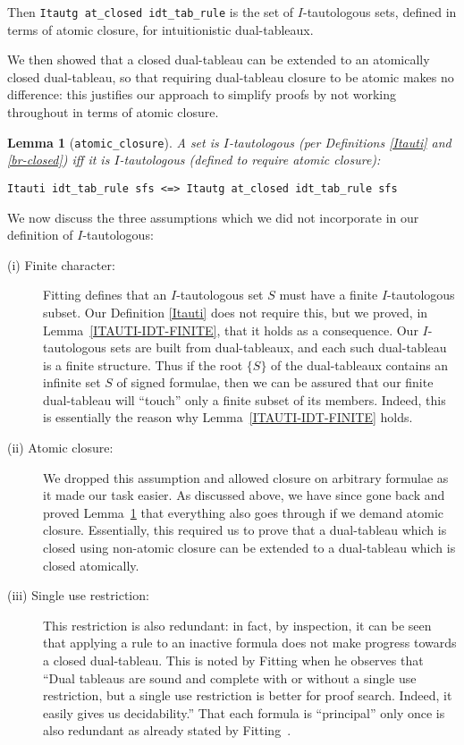 \documentclass[a4paper]{article}
\newtheorem{lemma}{Lemma}
\begin{document}
Then \texttt{Itautg at\_closed idt\_tab\_rule} is the set of
$I$-tautologous sets, defined in terms of atomic closure, for
intuitionistic dual-tableaux.

We then showed 
that a closed dual-tableau can be extended to an atomically closed
dual-tableau, so
that requiring dual-tableau closure to be atomic makes no difference:
this justifies our approach to simplify proofs by not working throughout
in terms of atomic closure.

\begin{lemma}[\texttt{atomic\_closure}]\label{atomic-closure}
A set is $I$-tautologous (per Definitions \ref{Itauti} and \ref{br-closed})
iff it is $I$-tautologous (defined to require atomic closure):
\end{lemma}
\begin{verbatim}
Itauti idt_tab_rule sfs <=> Itautg at_closed idt_tab_rule sfs 
\end{verbatim}

We now discuss the three assumptions which we did not incorporate
in our definition of $I$-tautologous:
\begin{description}
\item[\rm (i) Finite character:] Fitting defines that an $I$-tautologous
  set $S$ must have a finite $I$-tautologous subset.
  Our Definition \ref{Itauti} does not require this, but we proved,
  in Lemma~\ref{ITAUTI-IDT-FINITE}, that it holds as a consequence.
  Our $I$-tautologous sets are built from dual-tableaux, and each
  such dual-tableau is a finite structure. Thus if the root $\{S\}$ of the
  dual-tableaux contains an infinite set $S$ of signed formulae, then we
  can be assured that our finite dual-tableau will ``touch'' only a
  finite subset of its members. Indeed, this is essentially the reason
  why Lemma~\ref{ITAUTI-IDT-FINITE} holds.
\item[\rm (ii) Atomic closure:] We dropped this assumption and allowed
  closure on arbitrary formulae as it made our task easier.
  As discussed above, we have
  since gone back and proved Lemma~\ref{atomic-closure} that
  everything also goes through if we demand atomic
  closure. Essentially, this required us to prove that a dual-tableau
  which is closed using non-atomic closure can be extended to a
  dual-tableau which is closed atomically.
\item[\rm (iii) Single use restriction:] This restriction is also
  redundant: in fact, by inspection, it can be seen that applying a
  rule to an inactive formula does not make progress towards a closed
  dual-tableau.  This is noted by Fitting when he observes that ``Dual
  tableaus are sound and complete with or without a single use
  restriction, but a single use restriction is better for proof
  search. Indeed, it easily gives us decidability.''  That each
  formula is ``principal'' only once is also redundant as already
  stated by Fitting~\cite[just after his Definition~2]{fitting-dual-tableau}.
\end{description}
\end{document}
